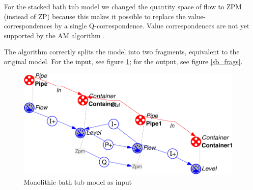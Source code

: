 \documentclass{article} %
\begin{document}
For the stacked bath tub model we changed the quantity space of flow to ZPM
(instead of ZP) because this makes it possible to replace the
value-correspondences by a single Q-correspondence. Value correspondences are
not yet supported by the AM algorithm \cite{vanweelden}.  

The algorithm correctly splits the model into two fragments, equivalent to the
original model. For the input, see figure \ref{sb_mono}; for the output, see
figure \ref{sb_frags}.

\begin{figure}[ht]
\centering
\includegraphics[scale=0.5]{sb_mono-crop.pdf}
\caption{Monolithic bath tub model as input}
\label{sb_mono}
\end{figure}

\end{document}
